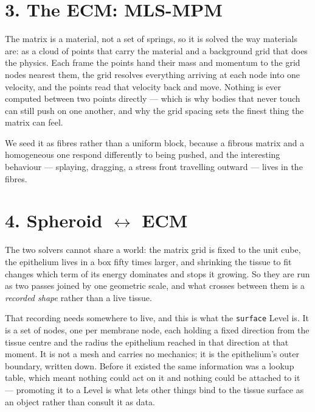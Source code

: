 \documentclass[10pt,a4paper]{article}
\newcommand{\op}[1]{\texttt{#1}}
\begin{document}
\section*{3.\; The ECM: MLS-MPM}

The matrix is a material, not a set of springs, so it is solved the way materials are: as a cloud of
points that carry the material and a background grid that does the physics. Each frame the points hand
their mass and momentum to the grid nodes nearest them, the grid resolves everything arriving at each
node into one velocity, and the points read that velocity back and move. Nothing is ever computed
between two points directly --- which is why bodies that never touch can still push on one another, and
why the grid spacing sets the finest thing the matrix can feel.

We seed it as fibres rather than a uniform block, because a fibrous matrix and a homogeneous one respond
differently to being pushed, and the interesting behaviour --- splaying, dragging, a stress front
travelling outward --- lives in the fibres.

\section*{4.\; Spheroid $\leftrightarrow$ ECM}

The two solvers cannot share a world: the matrix grid is fixed to the unit cube, the epithelium lives in
a box fifty times larger, and shrinking the tissue to fit changes which term of its energy dominates and
stops it growing. So they are run as two passes joined by one geometric scale, and what crosses between
them is a \emph{recorded shape} rather than a live tissue.

That recording needs somewhere to live, and this is what the \op{surface} Level is. It is a set of
nodes, one per membrane node, each holding a fixed direction from the tissue centre and the radius the
epithelium reached in that direction at that moment. It is not a mesh and carries no mechanics; it is
the epithelium's outer boundary, written down. Before it existed the same information was a lookup
table, which meant nothing could act on it and nothing could be attached to it --- promoting it to a
Level is what lets other things bind to the tissue surface as an object rather than consult it as data.
\end{document}
